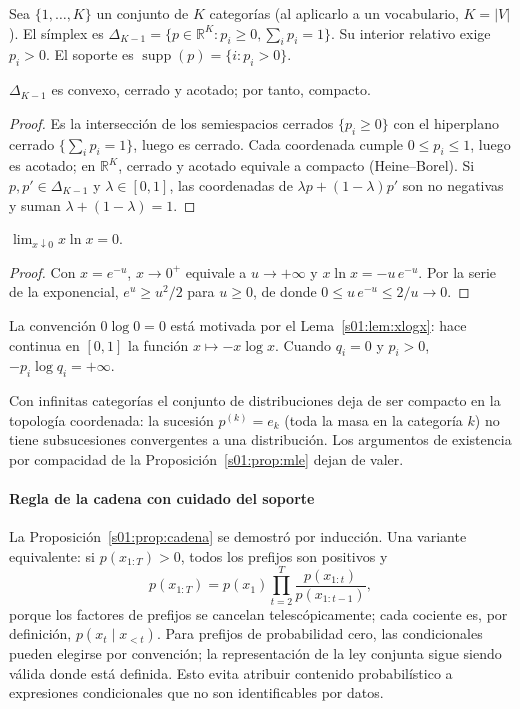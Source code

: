 Sea $\{1,\ldots,K\}$ un conjunto de $K$ categorías (al aplicarlo a un vocabulario,
$K=|V|$). El símplex es
$\Delta_{K-1}=\{p\in\mathbb R^K:p_i\ge0,\sum_i p_i=1\}$.
Su interior relativo exige $p_i>0$. El soporte es
$\operatorname{supp}(p)=\{i:p_i>0\}$.
\begin{lema}\label{s01:lem:simplex}
$\Delta_{K-1}$ es convexo, cerrado y acotado; por tanto, compacto.
\end{lema}
\begin{proof}
Es la intersección de los semiespacios cerrados $\{p_i\ge0\}$ con el hiperplano
cerrado $\{\sum_ip_i=1\}$, luego es cerrado. Cada coordenada cumple $0\le p_i\le1$,
luego es acotado; en $\mathbb R^K$, cerrado y acotado equivale a compacto
(Heine--Borel). Si $p,p'\in\Delta_{K-1}$ y $\lambda\in[0,1]$, las coordenadas de
$\lambda p+(1-\lambda)p'$ son no negativas y suman $\lambda+(1-\lambda)=1$.
\end{proof}
\begin{lema}\label{s01:lem:xlogx}
$\lim_{x\downarrow0}x\ln x=0$.
\end{lema}
\begin{proof}
Con $x=e^{-u}$, $x\to0^+$ equivale a $u\to+\infty$ y $x\ln x=-u\,e^{-u}$. Por la
serie de la exponencial, $e^u\ge u^2/2$ para $u\ge0$, de donde
$0\le u\,e^{-u}\le2/u\to0$.
\end{proof}
La convención $0\log0=0$ está motivada por el Lema~\ref{s01:lem:xlogx}: hace
continua en $[0,1]$ la función $x\mapsto -x\log x$. Cuando $q_i=0$ y $p_i>0$,
$-p_i\log q_i=+\infty$.
\begin{observacion}
Con infinitas categorías el conjunto de distribuciones deja de ser compacto en
la topología coordenada: la sucesión $p^{(k)}=e_k$ (toda la masa en la categoría
$k$) no tiene subsucesiones convergentes a una distribución. Los argumentos de
existencia por compacidad de la Proposición~\ref{s01:prop:mle} dejan de valer.
\end{observacion}

\paragraph{Regla de la cadena con cuidado del soporte}
La Proposición~\ref{s01:prop:cadena} se demostró por inducción. Una variante
equivalente: si $p(x_{1:T})>0$, todos los prefijos son positivos y
\[
p(x_{1:T})=p(x_1)\prod_{t=2}^T\frac{p(x_{1:t})}{p(x_{1:t-1})},
\]
porque los factores de prefijos se cancelan telescópicamente; cada cociente es,
por definición, $p(x_t\mid x_{<t})$.
Para prefijos de probabilidad cero, las condicionales pueden elegirse por
convención; la representación de la ley conjunta sigue siendo válida donde
está definida. Esto evita atribuir contenido probabilístico a expresiones
condicionales que no son identificables por datos.


